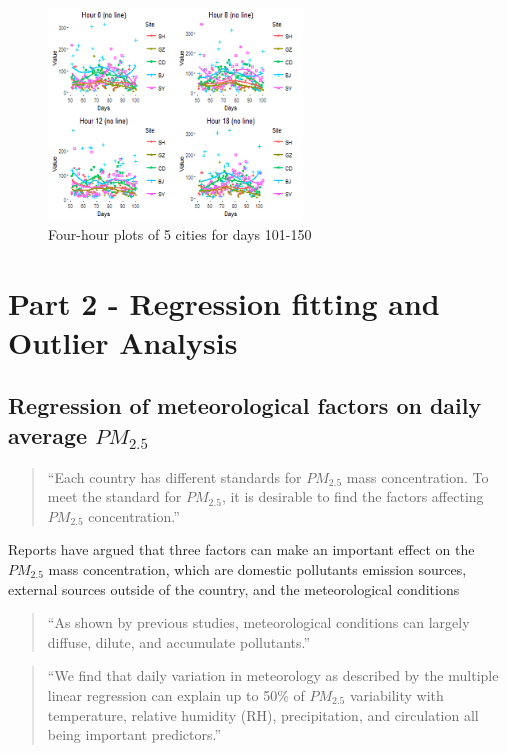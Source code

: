 \documentclass[11pt]{article} %
\begin{document}
\begin{figure}[!ht]
  \centering
    \includegraphics[width=0.6\textwidth]{Figure1-4}
      \caption{Four-hour plots of 5 cities for days 101-150}
\end{figure}

\newpage

\section{Part 2 - Regression fitting and Outlier Analysis}
\subsection{Regression of meteorological factors on daily average \(PM_{2.5}\)}

 \begin{quotation}
“Each country has different standards for \(PM_{2.5}\) mass concentration. To meet the standard for \(PM_{2.5}\), it is desirable to find the factors affecting \(PM_{2.5}\) concentration.”\cite{Chatani11}
 \end{quotation}
 
 Reports have argued that three factors can make an important effect on the \(PM_{2.5}\) mass concentration, which are domestic pollutants emission sources, external sources outside of the country, and the meteorological conditions
 
  \begin{quotation}
“As shown by previous studies, meteorological conditions can largely diffuse, dilute, and accumulate pollutants.”\cite{Pohjola02}
 \end{quotation}
 
  \begin{quotation}
“We find that daily variation in meteorology as described by the multiple linear regression can explain up to 50\% of \(PM_{2.5}\) variability with temperature, relative humidity (RH), precipitation, and circulation all being important predictors.”\cite{Tai10}
 \end{quotation}
 
\end{document}
